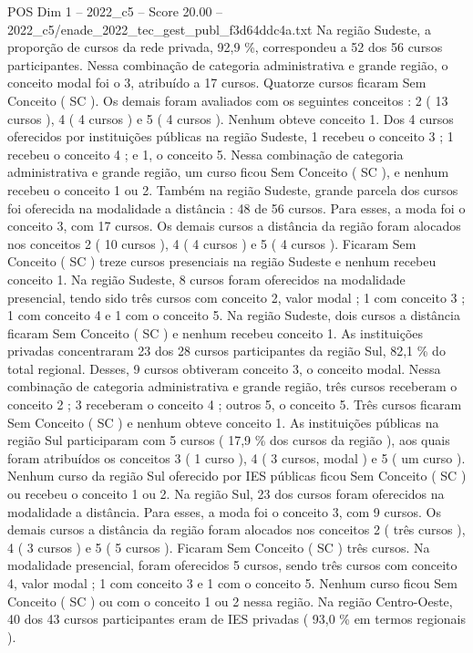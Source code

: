 \begin{textsample}{POS Dim 1 – 2022\_c5 – Score 20.00 – 2022\_c5/enade\_2022\_tec\_gest\_publ\_f3d64ddc4a.txt}
Na região Sudeste, a proporção de cursos da rede privada, 92,9 \%, correspondeu a 52 dos 56 cursos participantes.
Nessa combinação de categoria administrativa e grande região, o conceito modal foi o 3, atribuído a 17 cursos.
Quatorze cursos ficaram Sem Conceito ( SC ).
Os demais foram avaliados com os seguintes conceitos : 2 ( 13 cursos ), 4 ( 4 cursos ) e 5 ( 4 cursos ).
Nenhum obteve conceito 1.
Dos 4 cursos oferecidos por instituições públicas na região Sudeste, 1 recebeu o conceito 3 ; 1 recebeu o conceito 4 ; e 1, o conceito 5.
Nessa combinação de categoria administrativa e grande região, um curso ficou Sem Conceito ( SC ), e nenhum recebeu o conceito 1 ou 2.
Também na região Sudeste, grande parcela dos cursos foi oferecida na modalidade a distância : 48 de 56 cursos.
Para esses, a moda foi o conceito 3, com 17 cursos.
Os demais cursos a distância da região foram alocados nos conceitos 2 ( 10 cursos ), 4 ( 4 cursos ) e 5 ( 4 cursos ).
Ficaram Sem Conceito ( SC ) treze cursos presenciais na região Sudeste e nenhum recebeu conceito 1.
Na região Sudeste, 8 cursos foram oferecidos na modalidade presencial, tendo sido três cursos com conceito 2, valor modal ; 1 com conceito 3 ; 1 com conceito 4 e 1 com o conceito 5.
Na região Sudeste, dois cursos a distância ficaram Sem Conceito ( SC ) e nenhum recebeu conceito 1.
As instituições privadas concentraram 23 dos 28 cursos participantes da região Sul, 82,1 \% do total regional.
Desses, 9 cursos obtiveram conceito 3, o conceito modal.
Nessa combinação de categoria administrativa e grande região, três cursos receberam o conceito 2 ; 3 receberam o conceito 4 ; outros 5, o conceito 5.
Três cursos ficaram Sem Conceito ( SC ) e nenhum obteve conceito 1.
As instituições públicas na região Sul participaram com 5 cursos ( 17,9 \% dos cursos da região ), aos quais foram atribuídos os conceitos 3 ( 1 curso ), 4 ( 3 cursos, modal ) e 5 ( um curso ).
Nenhum curso da região Sul oferecido por IES públicas ficou Sem Conceito ( SC ) ou recebeu o conceito 1 ou 2.
Na região Sul, 23 dos cursos foram oferecidos na modalidade a distância.
Para esses, a moda foi o conceito 3, com 9 cursos.
Os demais cursos a distância da região foram alocados nos conceitos 2 ( três cursos ), 4 ( 3 cursos ) e 5 ( 5 cursos ).
Ficaram Sem Conceito ( SC ) três cursos.
Na modalidade presencial, foram oferecidos 5 cursos, sendo três cursos com conceito 4, valor modal ; 1 com conceito 3 e 1 com o conceito 5.
Nenhum curso ficou Sem Conceito ( SC ) ou com o conceito 1 ou 2 nessa região.
Na região Centro-Oeste, 40 dos 43 cursos participantes eram de IES privadas ( 93,0 \% em termos regionais ).

\end{textsample}
